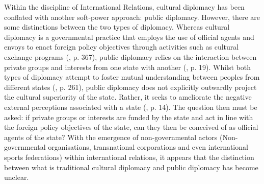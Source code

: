Within the discipline of International Relations, cultural diplomacy has been conflated with another soft-power approach: public diplomacy. However, there are some distinctions between the two types of diplomacy. Whereas cultural diplomacy is a governmental practice that employs the use of official agents and envoys to enact foreign policy objectives through activities such as cultural exchange programs (\cite{ang2015}, p. 367), public diplomacy relies on the interaction between private groups and interests from one state with another (\cite{cull2008}, p. 19). Whilst both types of diplomacy attempt to foster mutual understanding between peoples from different states (\cite{hartig2016}, p. 261), public diplomacy does not explicitly outwardly project the cultural superiority of the state. Rather, it seeks to ameliorate the negative external perceptions associated with a state (\cite{melissen2011}, p. 14). The question then must be asked: if private groups or interests are funded by the state and act in line with the foreign policy objectives of the state, can they then be conceived of as official agents of the state? With the emergence of non-governmental actors (Non-governmental organisations, transnational corporations and even international sports federations) within international relations, it appears that the distinction between what is traditional cultural diplomacy and public diplomacy has become unclear.

